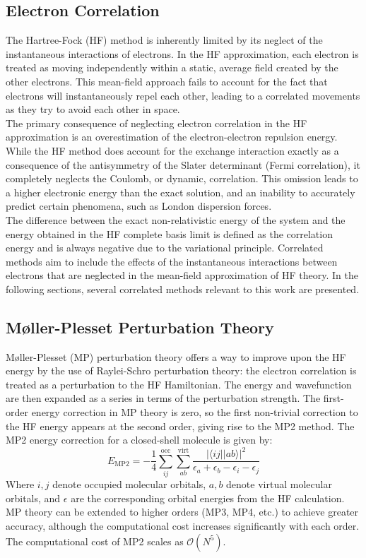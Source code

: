 \subsection{Electron Correlation}
\label{subsec:electron_correlation}
The Hartree-Fock (HF) method is inherently limited by its neglect of the instantaneous interactions of electrons. In the HF approximation, each electron is treated as moving independently within a static, average field created by the other electrons. This mean-field approach fails to account for the fact that electrons will instantaneously repel each other, leading to a correlated movements as they try to avoid each other in space.\\
The primary consequence of neglecting electron correlation in the HF approximation is an overestimation of the electron-electron repulsion energy. While the HF method does account for the exchange interaction exactly as a consequence of the antisymmetry of the Slater determinant (Fermi correlation), it completely neglects the Coulomb, or dynamic, correlation. This omission leads to a higher electronic energy than the exact solution, and an inability to accurately predict certain phenomena, such as London dispersion forces.\\
The difference between the exact non-relativistic energy of the system and the energy obtained in the HF complete basis limit is defined as the correlation energy and is always negative due to the variational principle. Correlated methods aim to include the effects of the instantaneous interactions between electrons that are neglected in the mean-field approximation of HF theory. In the following sections, several correlated methods relevant to this work are presented.

\subsection{Møller-Plesset Perturbation Theory}
Møller-Plesset (MP)\cite{shavitt2009many} perturbation theory offers a way to improve upon the HF energy by the use of Raylei-Schro perturbation theory: the electron correlation is treated as a perturbation to the HF Hamiltonian. The energy and wavefunction are then expanded as a series in terms of the perturbation strength. The first-order energy correction in MP theory is zero, so the first non-trivial correction to the HF energy appears at the second order, giving rise to the MP2 method. The MP2 energy correction for a closed-shell molecule is given by:
\begin{equation} \label{eq:MP2}
    E_{\mathrm{MP2}} = - \frac{1}{4} \sum_{ij}^{\mathrm{occ}} \sum_{ab}^{\mathrm{virt}} \frac{|\langle i j || a b \rangle|^2}{\epsilon_a + \epsilon_b - \epsilon_i - \epsilon_j}
\end{equation}
Where $i,j$ denote occupied molecular orbitals, $a,b$ denote virtual molecular orbitals, and $\epsilon$ are the corresponding orbital energies from the HF calculation. MP theory can be extended to higher orders (MP3, MP4, etc.) to achieve greater accuracy, although the computational cost increases significantly with each order. The computational cost of MP2 scales as $\mathcal{O}(N^5)$.

